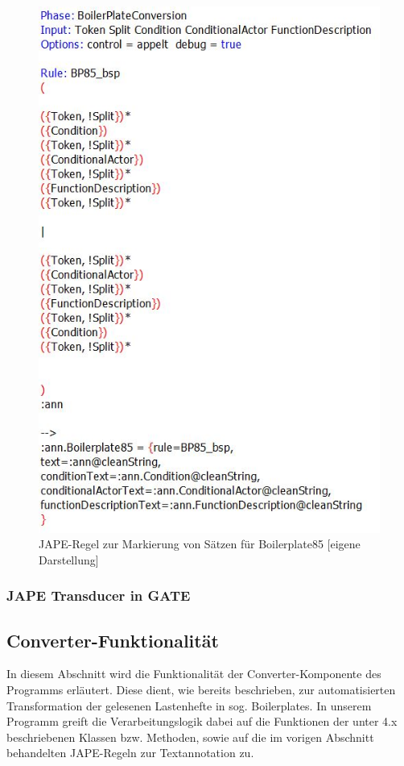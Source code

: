 \documentclass[12pt]{report}
\begin{document}
\begin{figure}[h!]
\begin{center}
\includegraphics[scale=0.8]{Bilder/Boilerplate85Jape.jpg}
\caption{JAPE-Regel zur Markierung von Sätzen für Boilerplate85 [eigene Darstellung]}
\end{center}
\end{figure}

\subsubsection{JAPE Transducer in GATE}

\subsection{Converter-Funktionalität}
In diesem Abschnitt wird die Funktionalität der Converter-Komponente des Programms erläutert. Diese dient, wie bereits beschrieben, zur automatisierten Transformation der gelesenen Lastenhefte in sog. Boilerplates. In unserem Programm greift die Verarbeitungslogik dabei auf die Funktionen der unter 4.x beschriebenen Klassen bzw. Methoden, sowie auf die im vorigen Abschnitt behandelten JAPE-Regeln zur Textannotation zu. 
\end{document}
